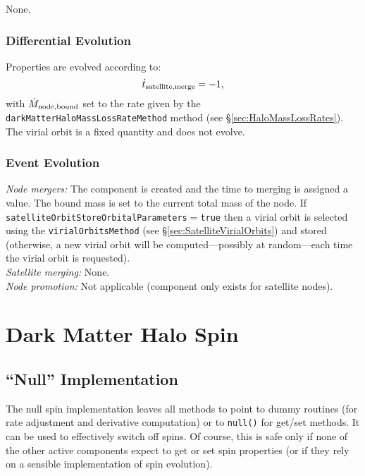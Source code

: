 None.

\subsubsection{Differential Evolution}

Properties are evolved according to:
\begin{equation}
 \dot{t}_{\rm satellite, merge} = -1,
\end{equation}
with $\dot{M}_{\rm node,bound}$ set to the rate given by the {\tt darkMatterHaloMassLossRateMethod} method (see \S\ref{sec:HaloMassLossRates}). The virial orbit is a fixed quantity and does not evolve.

\subsubsection{Event Evolution}

\noindent\emph{Node mergers:} The component is created and the time to merging is assigned a value. The bound mass is set to the current total mass of the node. If {\tt satelliteOrbitStoreOrbitalParameters}$=${\tt true} then a virial orbit is selected using the {\tt virialOrbitsMethod} (see \S\ref{sec:SatelliteVirialOrbits}) and stored (otherwise, a new virial orbit will be computed---possibly at random---each time the virial orbit is requested).\\

\noindent\emph{Satellite merging:} None.\\

\noindent\emph{Node promotion:} Not applicable (component only exists for satellite nodes).\\

\section{Dark Matter Halo Spin}

\subsection{``Null'' Implementation}

The null spin implementation leaves all methods to point to dummy routines (for rate adjustment and derivative computation) or to {\tt null()} for get/set methods. It can be used to effectively switch off spins. Of course, this is safe only if none of the other active components expect to get or set spin properties (or if they rely on a sensible implementation of spin evolution).

